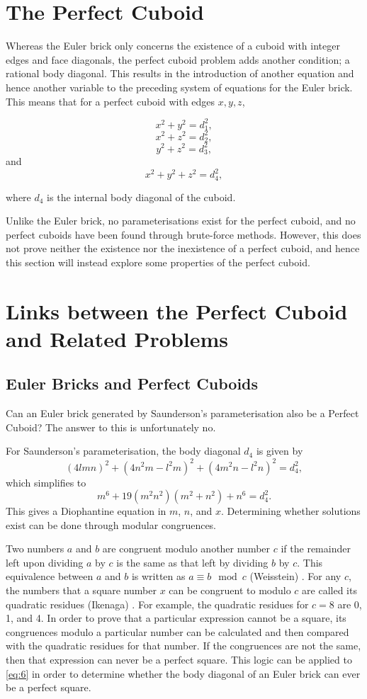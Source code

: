 \documentclass[11pt]{article}
\begin{document}
\section{The Perfect Cuboid}
Whereas the Euler brick only concerns the existence of a cuboid with integer edges and face diagonals, the perfect cuboid problem adds another condition; a rational body diagonal\cite{perfectcuboid}. This results in the introduction of another equation and hence another variable to the preceding system of equations for the Euler brick. This means that for a perfect cuboid with edges $x, y, z$,

$$x^2+y^2=d_1^2,$$
$$x^2+z^2=d_2^2,$$
$$y^2+z^2=d_3^2,$$
and \\
$$x^2+y^2+z^2=d_4^2,$$

where $d_4$ is the internal body diagonal of the cuboid. 

Unlike the Euler brick, no parameterisations exist for the perfect cuboid, and no perfect cuboids have been found through brute-force methods. However, this does not prove neither the existence nor the inexistence of a perfect cuboid, and hence this section will instead explore some properties of the perfect cuboid.

\section{Links between the Perfect Cuboid and Related Problems}

\subsection{Euler Bricks and Perfect Cuboids}
Can an Euler brick generated by Saunderson's parameterisation also be a Perfect Cuboid? The answer to this is unfortunately no.

For Saunderson's parameterisation, the body diagonal $d_4$ is given by
$$(4lmn)^2+(4n^2m-l^2m)^2+(4m^2n-l^2n)^2=d_4^2,$$
which simplifies to
\begin{equation}
m^6+19(m^2n^2)(m^2+n^2)+n^6=d_4^2.
\end{equation}
This gives a Diophantine equation in $m$, $n$, and $x$. Determining whether solutions exist can be done through modular congruences.

Two numbers $a$ and $b$ are congruent modulo another number $c$ if the remainder left upon dividing $a$ by $c$ is the same as that left by dividing $b$ by $c$. This equivalence between $a$ and $b$ is written as $a\equiv{b}\mod{c}$ (Weisstein) \cite{congruence}. For any $c$, the numbers that a square number $x$ can be congruent to modulo $c$ are called its quadratic residues (Ikenaga) \cite{residues}. For example, the quadratic residues for $c=8$ are 0, 1, and 4. In order to prove that a particular expression cannot be a square, its congruences modulo a particular number can be calculated and then compared with the quadratic residues for that number. If the congruences are not the same, then that expression can never be a perfect square. This logic can be applied to \eqref{eq:6} in order to determine whether the body diagonal of an Euler brick can ever be a perfect square. 
\end{document}
